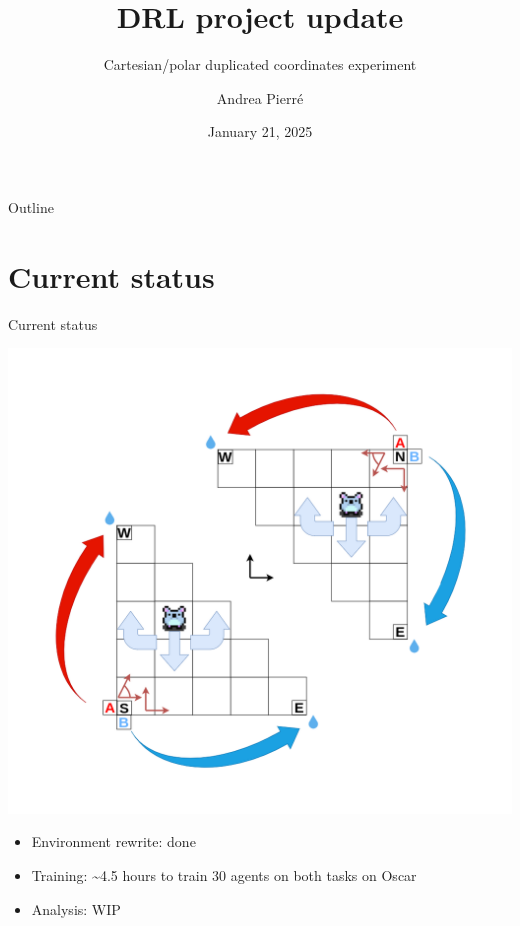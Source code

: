 \documentclass[bigger]{beamer}
\author{Andrea Pierré}
\date{January 21, 2025}
\title{DRL project update}
\subtitle{Cartesian/polar duplicated coordinates experiment}
\begin{document}
\maketitle
\begin{frame}[plain]{Outline}
\tableofcontents
\end{frame}

\section{Current status}
\label{sec:org278a306}
\begin{frame}[label={sec:orgafd0086}]{Current status}
\begin{center}
\includegraphics[height=0.6\textheight]{img/RL_env-cartesian-polar.drawio.png}
\end{center}
\begin{itemize}
\item Environment rewrite: done
\item Training: \textasciitilde{}4.5 hours to train 30 agents on both tasks on Oscar
\item Analysis: WIP
\end{itemize}
\end{frame}
\end{document}

